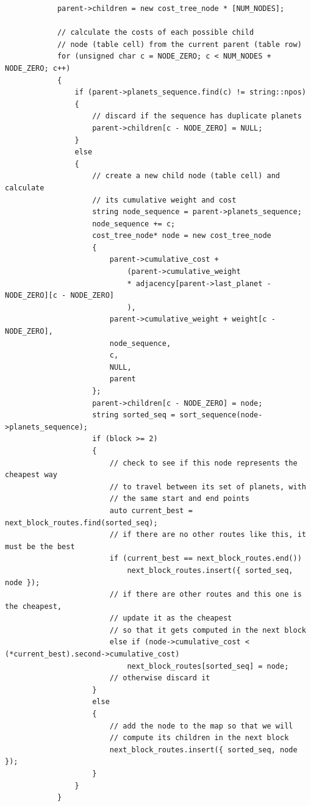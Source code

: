 \documentclass[
]{article}
\begin{document}
\begin{verbatim}
            parent->children = new cost_tree_node * [NUM_NODES];

            // calculate the costs of each possible child 
            // node (table cell) from the current parent (table row)
            for (unsigned char c = NODE_ZERO; c < NUM_NODES + NODE_ZERO; c++)
            {
                if (parent->planets_sequence.find(c) != string::npos)
                {
                    // discard if the sequence has duplicate planets
                    parent->children[c - NODE_ZERO] = NULL;
                }
                else
                {
                    // create a new child node (table cell) and calculate 
                    // its cumulative weight and cost
                    string node_sequence = parent->planets_sequence;
                    node_sequence += c;
                    cost_tree_node* node = new cost_tree_node
                    {
                        parent->cumulative_cost + 
                            (parent->cumulative_weight 
                            * adjacency[parent->last_planet - NODE_ZERO][c - NODE_ZERO]
                            ),
                        parent->cumulative_weight + weight[c - NODE_ZERO],
                        node_sequence,
                        c,
                        NULL,
                        parent
                    };
                    parent->children[c - NODE_ZERO] = node;
                    string sorted_seq = sort_sequence(node->planets_sequence);
                    if (block >= 2)
                    {
                        // check to see if this node represents the cheapest way 
                        // to travel between its set of planets, with
                        // the same start and end points
                        auto current_best = next_block_routes.find(sorted_seq);
                        // if there are no other routes like this, it must be the best
                        if (current_best == next_block_routes.end())
                            next_block_routes.insert({ sorted_seq, node });
                        // if there are other routes and this one is the cheapest, 
                        // update it as the cheapest
                        // so that it gets computed in the next block
                        else if (node->cumulative_cost < (*current_best).second->cumulative_cost) 
                            next_block_routes[sorted_seq] = node;
                        // otherwise discard it
                    }
                    else
                    {
                        // add the node to the map so that we will 
                        // compute its children in the next block
                        next_block_routes.insert({ sorted_seq, node });
                    }
                }
            }


\end{verbatim}
\end{document}
